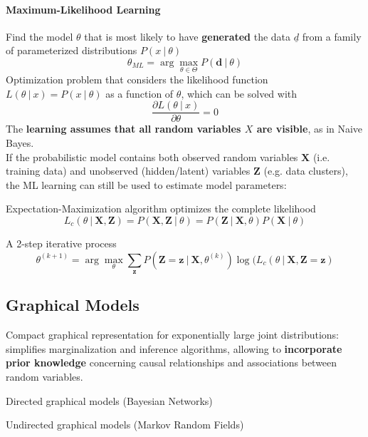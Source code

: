 \documentclass[10pt]{report}
\begin{document}
\paragraph{Maximum-Likelihood Learning} Find the model $\theta$ that is most likely to have \textbf{generated} the data $\underline{d}$ from a family of parameterized distributions $P(x\:|\:\theta)$
$$\theta_{ML} = \arg\max_{\theta\in \Theta} P(\mathbf{d}\:|\:\theta)$$
Optimization problem that considers the likelihood function $L(\theta\:|\:x)=P(x\:|\:\theta)$
as a function of $\theta$, which can be solved with $$\frac{\partial L(\theta\:|\:x)}{\partial\theta}=0$$
The \textbf{learning assumes that all random variables $X$ are visible}, as in Naive Bayes.\\
If the probabilistic model contains both observed random variables $\mathbf{X}$ (i.e. training data) and unobserved (hidden/latent) variables $\mathbf{Z}$ (e.g. data clusters), the ML learning can still be used to estimate model parameters:
\begin{list}{}{}
	\item Expectation-Maximization algorithm optimizes the complete likelihood
	$$L_c(\theta\:|\:\mathbf{X},\mathbf{Z})=P(\mathbf{X},\mathbf{Z}\:|\:\theta) = P(\mathbf{Z}\:|\:\mathbf{X},\theta)P(\mathbf{X}\:|\:\theta)$$
	\item A 2-step iterative process
	$$\theta^{(k+1)} = \arg\max_\theta\sum_{\mathbf{z}}P(\mathbf{Z}=\mathbf{z}\:|\:\mathbf{X},\theta^{(k)})\log(L_c(\theta\:|\:\mathbf{X},\mathbf{Z}=\mathbf{z})$$
\end{list}
\subsection{Graphical Models}
Compact graphical representation for exponentially large joint distributions: simplifies marginalization and inference algorithms, allowing to \textbf{incorporate prior knowledge} concerning causal relationships and associations between random variables.\begin{list}{}{}
	\item Directed graphical models (Bayesian Networks)
	\item Undirected graphical models (Markov Random Fields)
\end{list}
\end{document}
